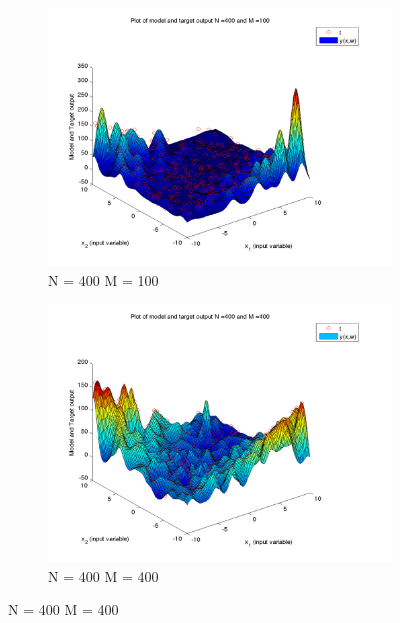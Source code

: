 \documentclass{article}
\begin{document}
\begin{figure}[H]
\begin{subfigure}{.5\textwidth}
\centering
\includegraphics[width=\linewidth]{D2/VaryingM_N400M100}
\caption{N = 400 M = 100}
\end{subfigure}
\begin{subfigure}{.5\textwidth}
\includegraphics[width=\linewidth]{D2/VaryingM_N400M400}
\caption{N = 400 M = 400}
\end{subfigure}


\end{figure}
\end{document}
